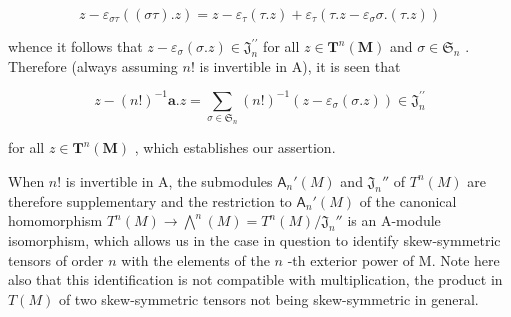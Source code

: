 \[
z - \varepsilon_ {\sigma \tau} ((\sigma \tau). z) = z - \varepsilon_ {\tau} (\tau . z) + \varepsilon_ {\tau} (\tau . z - \varepsilon_ {\sigma} \sigma . (\tau . z))
\]

whence it follows that \(z - \varepsilon_{\sigma}(\sigma . z) \in \mathfrak{J}_{n}^{\prime \prime}\) for all \(z \in \mathbf{T}^{n}(\mathbf{M})\) and \(\sigma \in \mathfrak{S}_{n}\) . Therefore (always assuming \(n!\) is invertible in A), it is seen that

\[
z - (n!) ^ {- 1} \boldsymbol {a}. z = \sum_ {\sigma \in \mathfrak {S} _ {n}} (n!) ^ {- 1} (z - \varepsilon_ {\sigma} (\sigma . z)) \in \mathfrak {J} _ {n} ^ {\prime \prime}
\]

for all \(z \in \mathbf{T}^n(\mathbf{M})\) , which establishes our assertion.

When \(n!\) is invertible in A, the submodules \(\mathsf{A}_n'(M)\) and \(\mathfrak{J}_n''\) of \(T^n(M)\) are therefore supplementary and the restriction to \(\mathsf{A}_n'(M)\) of the canonical homomorphism \(T^n(M) \to \bigwedge^n(M) = T^n(M)/\mathfrak{J}_n''\) is an A-module isomorphism, which allows us in the case in question to identify skew-symmetric tensors of order \(n\) with the elements of the \(n\) -th exterior power of M. Note here also that this identification is not compatible with multiplication, the product in \(T(M)\) of two skew-symmetric tensors not being skew-symmetric in general.

